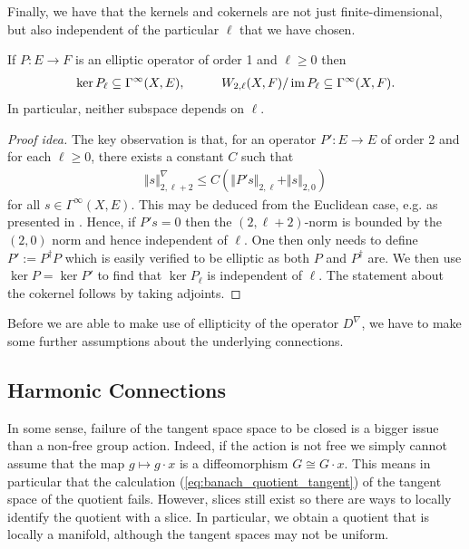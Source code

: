 \documentclass[12pt]{ociamthesis}  %
\begin{document}
Finally, we have that the kernels and cokernels are not just
finite-dimensional, but also independent of the particular $\ell$
that we have chosen.

\begin{theorem}\label{eq:independence_of_l}
  If $P:E\to F$ is an elliptic operator of order 1
  and $\ell\geq 0$ then
  \begin{align*}
    \ker P_\ell \subseteq \Gamma^\infty(X,E),\hspace{1cm}
    W_{2,\ell}(X,F)/\operatorname{im} P_\ell \subseteq \Gamma^\infty(X,F).
  \end{align*}
  In particular, neither subspace depends on $\ell$.
  \begin{proof}[Proof idea]
    The key observation is that, for an operator
    $P':E\to E$ of order 2 and for each $\ell\geq 0$,
    there exists a constant $C$ such that
    \begin{align*}
      \Vert s\Vert^\nabla_{2,\ell+2} \leq C(\Vert P's\Vert_{2,\ell} + \Vert s\Vert_{2,0})
    \end{align*}
    for all $s\in\Gamma^\infty(X,E)$.
    This may be deduced from the Euclidean case, e.g. as presented in
    \cite[6.3.1 Theorem 2]{evans1998}. Hence, if $P's = 0$ then the
    $(2,\ell+2)$-norm is bounded
    by the $(2,0)$ norm and hence independent of $\ell$.
    One then only needs to define $P' := P^\dagger P$ which is easily
    verified to be elliptic as both $P$ and $P^\dagger$ are. We then
    use $\ker P = \ker P'$
    to find that $\ker P_\ell$ is independent of $\ell$. The
    statement about the cokernel follows by taking adjoints.
  \end{proof}
\end{theorem}

Before we are able to make use of ellipticity of the operator
$D^\nabla$, we have to make some further assumptions about the
underlying connections.

\subsection{Harmonic Connections}

In some sense, failure of the tangent space space to be closed is a bigger issue
than a non-free group action. Indeed, if the action is not free we simply cannot
assume that the map $g\mapsto g\cdot x$ is a diffeomorphism $G\cong G\cdot x$.
This means in particular that the calculation (\ref{eq:banach_quotient_tangent})
of the tangent space of the quotient fails. However, slices still exist so there
are ways to locally identify the quotient with a slice. In particular, we obtain
a quotient that is locally a manifold, although the tangent spaces may not be
uniform.
\end{document}
